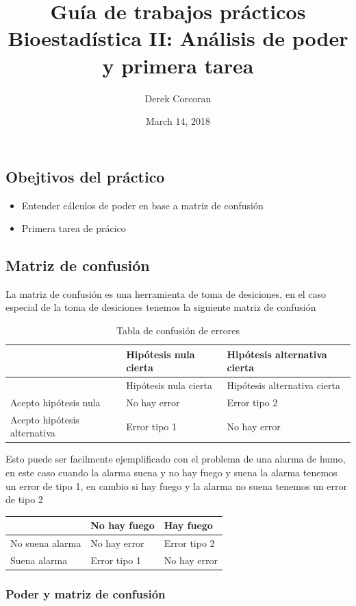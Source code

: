 \documentclass[]{article}
\title{Guía de trabajos prácticos Bioestadística II: Análisis de poder y
primera tarea}
\author{Derek Corcoran}
\date{March 14, 2018}
\providecommand{\tightlist}{%
  \setlength{\itemsep}{0pt}\setlength{\parskip}{0pt}}
\begin{document}
\maketitle

{
\setcounter{tocdepth}{2}
\tableofcontents
}
\subsection{Obejtivos del práctico}\label{obejtivos-del-practico}

\begin{itemize}
\tightlist
\item
  Entender cálculos de poder en base a matriz de confusión
\item
  Primera tarea de prácico
\end{itemize}

\subsection{Matriz de confusión}\label{matriz-de-confusion}

La matriz de confusión es una herramienta de toma de desiciones, en el
caso especial de la toma de desiciones tenemos la siguiente matriz de
confusión

\begin{longtable}[]{@{}lll@{}}
\caption{Tabla de confusión de errores}\tabularnewline
\toprule
& Hipótesis nula cierta & Hipótesis alternativa cierta\tabularnewline
\midrule
\endfirsthead
\toprule
& Hipótesis nula cierta & Hipótesis alternativa cierta\tabularnewline
\midrule
\endhead
Acepto hipótesis nula & No hay error & Error tipo 2\tabularnewline
Acepto hipótesis alternativa & Error tipo 1 & No hay
error\tabularnewline
\bottomrule
\end{longtable}

Esto puede ser facilmente ejemplificado con el problema de una alarma de
humo, en este caso cuando la alarma suena y no hay fuego y suena la
alarma tenemos un error de tipo 1, en cambio si hay fuego y la alarma no
suena tenemos un error de tipo 2

\begin{longtable}[]{@{}lll@{}}
\toprule
& No hay fuego & Hay fuego\tabularnewline
\midrule
\endhead
No suena alarma & No hay error & Error tipo 2\tabularnewline
Suena alarma & Error tipo 1 & No hay error\tabularnewline
\bottomrule
\end{longtable}

\subsubsection{Poder y matriz de
confusión}\label{poder-y-matriz-de-confusion}
\end{document}
